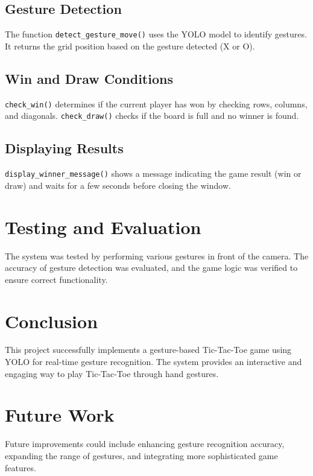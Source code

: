 \documentclass[12pt]{article}
\begin{document}
\subsection{Gesture Detection}
    The function \texttt{detect\_gesture\_move()} uses the YOLO model to identify gestures. It returns the grid position based on the gesture detected (X or O).

\subsection{Win and Draw Conditions}
    \texttt{check\_win()} determines if the current player has won by checking rows, columns, and diagonals. \texttt{check\_draw()} checks if the board is full and no winner is found.

\subsection{Displaying Results}
    \texttt{display\_winner\_message()} shows a message indicating the game result (win or draw) and waits for a few seconds before closing the window.

\section{Testing and Evaluation}
    The system was tested by performing various gestures in front of the camera. The accuracy of gesture detection was evaluated, and the game logic was verified to ensure correct functionality.

\section{Conclusion}
    This project successfully implements a gesture-based Tic-Tac-Toe game using YOLO for real-time gesture recognition. The system provides an interactive and engaging way to play Tic-Tac-Toe through hand gestures.

\section{Future Work}
    Future improvements could include enhancing gesture recognition accuracy, expanding the range of gestures, and integrating more sophisticated game features.
\end{document}
